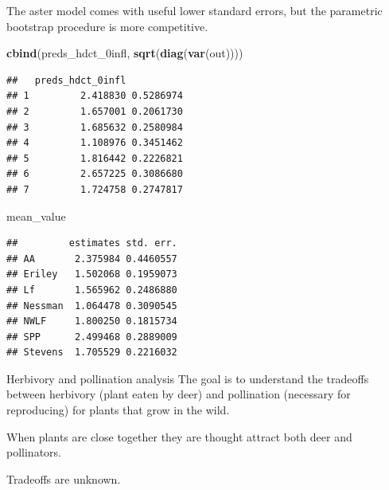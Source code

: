 \documentclass[
  ignorenonframetext,
]{beamer}
\newenvironment{Shaded}{\begin{snugshade}}{\end{snugshade}}
\newcommand{\FunctionTok}[1]{\textcolor[rgb]{0.13,0.29,0.53}{\textbf{#1}}}
\newcommand{\NormalTok}[1]{#1}
\begin{document}
\begin{frame}[fragile]{}
\protect\hypertarget{section-47}{}
The aster model comes with useful lower standard errors, but the
parametric bootstrap procedure is more competitive.

\vspace{12pt}
\tiny

\begin{Shaded}
\begin{Highlighting}[]
\FunctionTok{cbind}\NormalTok{(preds\_hdct\_0infl, }\FunctionTok{sqrt}\NormalTok{(}\FunctionTok{diag}\NormalTok{(}\FunctionTok{var}\NormalTok{(out))))}
\end{Highlighting}
\end{Shaded}

\begin{verbatim}
##   preds_hdct_0infl          
## 1         2.418830 0.5286974
## 2         1.657001 0.2061730
## 3         1.685632 0.2580984
## 4         1.108976 0.3451462
## 5         1.816442 0.2226821
## 6         2.657225 0.3086680
## 7         1.724758 0.2747817
\end{verbatim}

\begin{Shaded}
\begin{Highlighting}[]
\NormalTok{mean\_value}
\end{Highlighting}
\end{Shaded}

\begin{verbatim}
##         estimates std. err.
## AA       2.375984 0.4460557
## Eriley   1.502068 0.1959073
## Lf       1.565962 0.2486880
## Nessman  1.064478 0.3090545
## NWLF     1.800250 0.1815734
## SPP      2.499468 0.2889009
## Stevens  1.705529 0.2216032
\end{verbatim}
\end{frame}

\begin{frame}{Herbivory and pollination analysis}
\protect\hypertarget{herbivory-and-pollination-analysis}{}
The goal is to understand the tradeoffs between herbivory (plant eaten
by deer) and pollination (necessary for reproducing) for plants that
grow in the wild.

\vspace{12pt}

When plants are close together they are thought attract both deer and
pollinators.

\vspace{12pt}

Tradeoffs are unknown.
\end{frame}
\end{document}
